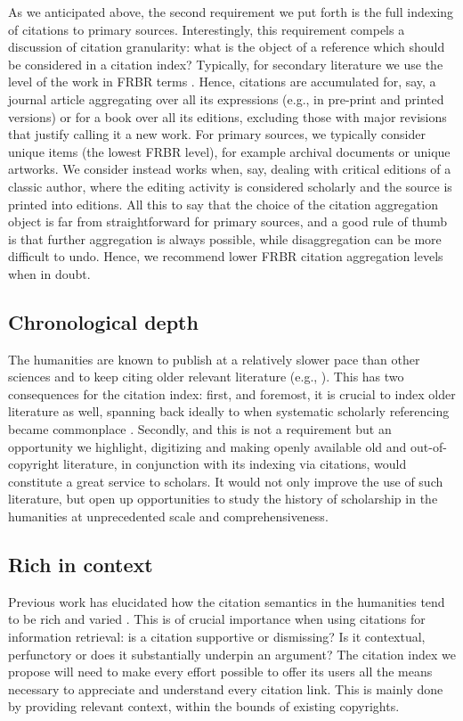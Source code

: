 As we anticipated above, the second requirement we put forth is the full indexing of citations to primary sources. Interestingly, this requirement compels a discussion of citation granularity: what is the object of a reference which should be considered in a citation index? Typically, for secondary literature we use the level of the work in FRBR terms \cite{ifla_functional_1997}. Hence, citations are accumulated for, say, a journal article aggregating over all its expressions (e.g., in pre-print and printed versions) or for a book over all its editions, excluding those with major revisions that justify calling it a new work. For primary sources, we typically consider unique items (the lowest FRBR level), for example archival documents or unique artworks. We consider instead works when, say, dealing with critical editions of a classic author, where the editing activity is considered scholarly and the source is printed into editions. All this to say that the choice of the citation aggregation object is far from straightforward for primary sources, and a good rule of thumb is that further aggregation is always possible, while disaggregation can be more difficult to undo. Hence, we recommend lower FRBR citation aggregation levels when in doubt.

\subsection{Chronological depth}
The humanities are known to publish at a relatively slower pace than other sciences and to keep citing older relevant literature (e.g., \cite{nederhof_bibliometric_2006, hellqvist_referencing_2010}). This has two consequences for the citation index: first, and foremost, it is crucial to index older literature as well, spanning back ideally to when systematic scholarly referencing became commonplace \cite{grafton_footnote_1999}. Secondly, and this is not a requirement but an opportunity we highlight, digitizing and making openly available old and out-of-copyright literature, in conjunction with its indexing via citations, would constitute a great service to scholars. It would not only improve the use of such literature, but open up opportunities to study the history of scholarship in the humanities at unprecedented scale and comprehensiveness.

\subsection{Rich in context}
Previous work has elucidated how the citation semantics in the humanities tend to be rich and varied \cite{hellqvist_referencing_2010}. This is of crucial importance when using citations for information retrieval: is a citation supportive or dismissing? Is it contextual, perfunctory or does it substantially underpin an argument? The citation index we propose will need to make every effort possible to offer its users all the means necessary to appreciate and understand every citation link. This is mainly done by providing relevant context, within the bounds of existing copyrights.
 
